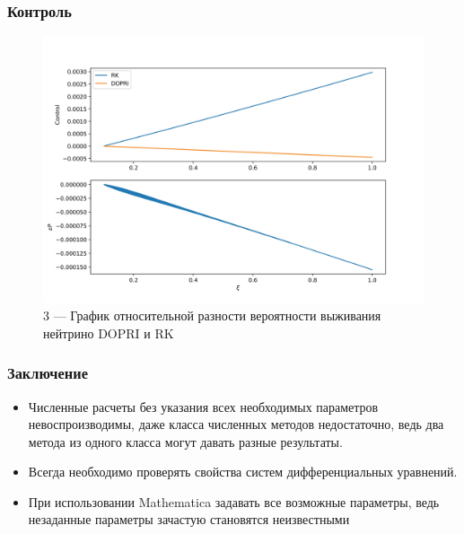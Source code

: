 \documentclass[utf8,9pt,mathserif,usepdftitle=false]{beamer}
\begin{document}
\begin{frame}
  \frametitle{Контроль}%
\begin{figure}[h!]
\centering

\includegraphics[width=0.8\linewidth]{(pr2-pr1)pr2.jpg}

\caption{3 — График относительной разности вероятности выживания нейтрино DOPRI и RK}

\label{fig:mpr}

\end{figure}
\end{frame}

\begin{frame}
  \frametitle{Заключение}%
  \begin{itemize}
  \item<1-> Численные расчеты без указания всех необходимых параметров невоспроизводимы, даже класса численных методов недостаточно, ведь два метода из одного класса могут давать разные результаты.
  \item<2-> Всегда необходимо проверять свойства систем дифференциальных уравнений.
  \item<3-> При использовании Mathematica задавать все возможные параметры, ведь незаданные параметры зачастую становятся неизвестными
  \end{itemize}
\end{frame}
\end{document}
